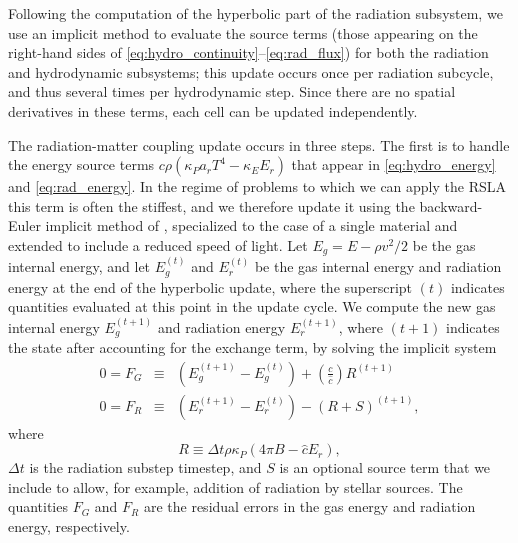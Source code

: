 \documentclass[fleqn,usenatbib]{mnras}
\begin{document}
Following the computation of the hyperbolic part of the radiation subsystem, we use an implicit method to evaluate the source terms (those appearing on the right-hand sides of \autoref{eq:hydro_continuity}--\autoref{eq:rad_flux}) for both the radiation and hydrodynamic subsystems; this update occurs once per radiation subcycle, and thus several times per hydrodynamic step. Since there are no spatial derivatives in these terms, each cell can be updated independently.

The radiation-matter coupling update occurs in three steps. The first is to handle the energy source terms $c\rho (\kappa_P a_r T^4 - \kappa_E E_r)$ that appear in \autoref{eq:hydro_energy} and \autoref{eq:rad_energy}. In the regime of problems to which we can apply the RSLA this term is often the stiffest, and we therefore update it using the backward-Euler implicit method of \cite{Howell_2003}, specialized to the case of a single material and extended to include a reduced speed of light. Let $E_g = E - \rho v^2/2$ be the gas internal energy, and let $E_g^{(t)}$ and $E_r^{(t)}$ be the gas internal energy and radiation energy at the end of the hyperbolic update, where the superscript $(t)$ indicates quantities evaluated at this point in the update cycle. We compute the new gas internal energy $E_g^{(t+1)}$ and radiation energy $E_r^{(t+1)}$, where $(t+1)$ indicates the state after accounting for the exchange term, by solving the implicit system
\begin{eqnarray}
0 = F_G &\equiv &\left(E_g^{(t+1)} - E_g^{(t)}\right) + \left( \frac{c}{\hat c} \right) R^{(t+1)} \\
0 = F_R &\equiv & \left(E_{r}^{(t+1)} - E_{r}^{(t)}\right) - \left( R + S \right)^{(t+1)},
\end{eqnarray}
where 
\begin{equation}
R \equiv \Delta t \rho \kappa_P (4 \pi B - \hat c E_r),
\end{equation}
$\Delta t$ is the radiation substep timestep, and $S$ is an optional source term that we include to allow, for example, addition of radiation by stellar sources. The quantities $F_G$ and $F_R$ are the residual errors in the gas energy and radiation energy, respectively.
\end{document}
